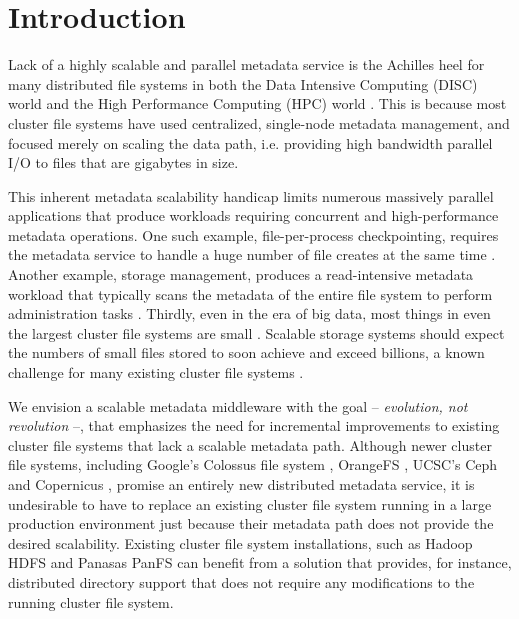 \section{Introduction}

Lack of a highly scalable and parallel metadata service is the
Achilles heel for many distributed file systems in both
the Data Intensive Computing (DISC) world \cite{HDFS}
and the High Performance Computing (HPC) world \cite{hpcs-io:2008, hecfsio:tr06}.
This is because most cluster file systems have used centralized, single-node
metadata management, and focused merely on scaling the data path,
i.e. providing high bandwidth parallel I/O to files that are gigabytes in size.

This inherent metadata scalability handicap limits numerous massively parallel
applications that produce workloads
requiring concurrent and high-performance metadata operations.
One such example, file-per-process checkpointing, requires the metadata service to
handle a huge number of file creates at the same time \cite{PLFS}.
Another example, storage management, produces a read-intensive metadata workload
that typically scans the metadata of the entire file system to perform
administration tasks \cite{filemgmt-ucsc, magellan-ucsc}.
Thirdly, even in the era of big data,
most things in even the largest cluster file systems are small
\cite{Dayal, brent13}.
Scalable storage systems should expect the numbers of small files stored
to soon achieve and exceed billions,
a known challenge for many existing cluster file systems \cite{GIGA11}.

We envision a scalable metadata middleware with
the goal -- \textit{evolution, not revolution} --,
that emphasizes the need for incremental improvements
to existing cluster file systems that lack a scalable metadata path.
Although newer cluster file systems, including Google's Colossus file system
\cite{50mfiles-in-googlefs:fikes10}, OrangeFS \cite{OrangeFS},
UCSC's Ceph \cite{ceph:weil06} and Copernicus \cite{sfs-ucsc},
promise an entirely new distributed metadata service,
it is undesirable to have to replace an existing cluster file system
running in a large production environment just
because their metadata path does not provide the desired scalability.
Existing cluster file system installations, such as
Hadoop HDFS \cite{HDFS} and Panasas PanFS \cite{PanFS}
can benefit from a solution that provides,
for instance, distributed directory support
that does not require any modifications to the running cluster file system.

